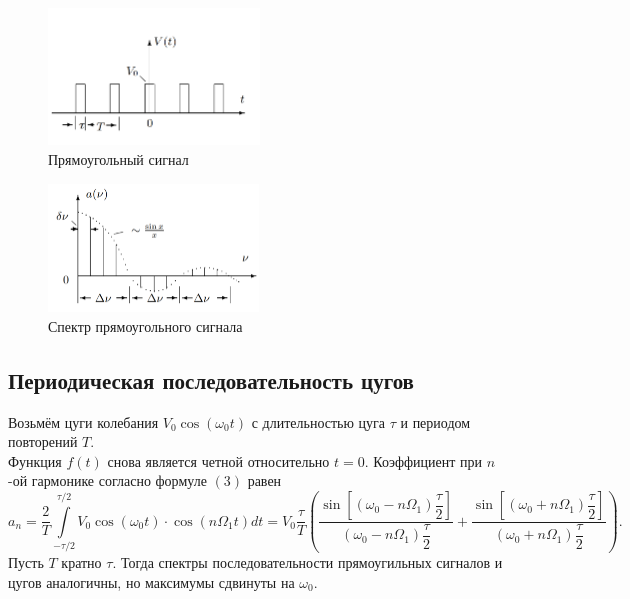 \documentclass[a4paper, 12pt]{article}
\begin{document}
\begin{figure}[H]
    \centering
    \includegraphics[width=0.5\textwidth]{data/square.png}
    \caption{Прямоугольный сигнал}
    \label{fig:data/square.png}
\end{figure}
\begin{figure}[H]
    \centering
    \includegraphics[width=0.5\textwidth]{data/spsquare.png}
    \caption{Спектр прямоугольного сигнала}
    \label{fig:data/spsquare.png}
\end{figure}

\subsection*{Периодическая последовательность цугов}
Возьмём цуги колебания $V_0 \cos(\omega_0 t)$ с длительностью цуга $\tau$ и периодом повторений $T$.\\
Функция $f(t)$ снова является четной относительно $t = 0$. Коэффициент при $n$-ой гармонике согласно формуле $(3)$ равен
\begin{equation}
a_n = \dfrac{2}{T}\int\limits_{-\tau/2}^{\tau/2}V_0 \cos \left(\omega_0t\right) \cdot \cos\left(n \Omega_1t\right)dt = V_0 \dfrac{\tau}{T}\left( \dfrac{\sin\left[\left(\omega_0 - n \Omega_1\right)\dfrac{\tau}{2}\right]}{\left( \omega_0 - n \Omega_1\right) \dfrac{\tau}{2}} + \dfrac{\sin\left[\left(\omega_0 + n \Omega_1\right)\dfrac{\tau}{2}\right]}{\left( \omega_0 + n \Omega_1\right) \dfrac{\tau}{2}}\right).
\end{equation}
Пусть $T$ кратно $\tau$. Тогда спектры последовательности прямоугильных сигналов и цугов аналогичны, но максимумы сдвинуты на $\omega_0$.
\end{document}
